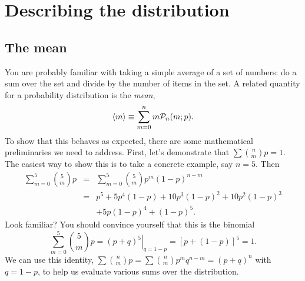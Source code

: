 \section{Describing the distribution}
\subsection{The mean}

You are probably familiar with taking a simple average of a set of numbers: do a sum over the set and divide by the number of items in the set.  A related quantity for a probability distribution is the \emph{mean},
\begin{equation}\label{e.mean}
 \left\langle m\right\rangle \equiv \sum_{m=0}^{n} m\mathcal{P}_{n}(m;p).
\end{equation}
To show that this behaves as expected, there are some mathematical preliminaries we need to address.  First, let's demonstrate that $\sum\binom{n}{m}{p} = 1$.  The easiest way to show this is to take a concrete example, say $n=5$.  Then
\begin{eqnarray*} \sum_{m=0}^{5}\binom{5}{m}{p} &=& \sum_{m=0}^{5}{5\choose m}p^{m}(1-p)^{n-m}\\
	&=&	p^{5}+5p^{4}(1-p)+10p^{3}(1-p)^{2}+10p^{2}(1-p)^{3}\\
	&& +5p(1-p)^{4}+(1-p)^{5}.
\end{eqnarray*}
Look familiar?  You should convince yourself that this is the binomial
\[ \sum_{m=0}^{5}\binom{5}{m}{p} = \left.\left(p+q\right)^{5}\right|_{q=1-p}
	= \left[p + \left(1-p\right)\right]^{5} = 1. \]
We can use this identity, $\sum\binom{n}{m}{p}=\sum{n\choose m}p^{m}q^{n-m} = (p+q)^{n}$ with $q=1-p$, to help us evaluate various sums over the distribution.

